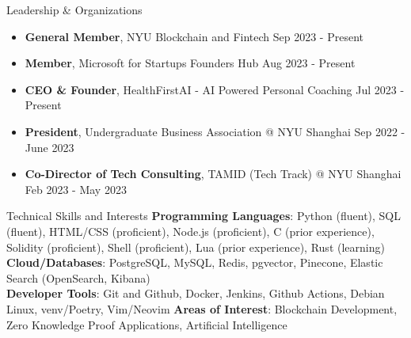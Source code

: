 \documentclass{resume} %
\begin{document}
\begin{rSection}{Leadership \& Organizations}
	\begin{itemize}
		\item \textbf{General Member}{, NYU Blockchain and Fintech} \hfill Sep 2023 - Present
		\item \textbf{Member}{, Microsoft for Startups Founders Hub} \hfill Aug 2023 - Present
		\item \textbf{CEO \& Founder}{, HealthFirstAI - AI Powered Personal Coaching} \hfill Jul 2023 - Present
		\item \textbf{President}{, Undergraduate Business Association @ NYU Shanghai} \hfill Sep 2022 - June 2023
		\item \textbf{Co-Director of Tech Consulting}{, TAMID (Tech Track) @ NYU Shanghai} \hfill Feb 2023 - May 2023
	\end{itemize}
\end{rSection}


\begin{rSection}{Technical Skills and Interests}
	\textbf{Programming Languages}{: Python (fluent), SQL (fluent), HTML/CSS (proficient), Node.js (proficient), C (prior experience), Solidity (proficient), Shell  (proficient), Lua (prior experience), Rust (learning)} \\
	\textbf{Cloud/Databases}{: PostgreSQL, MySQL, Redis, pgvector, Pinecone, Elastic Search (OpenSearch, Kibana)} \\
	\textbf{Developer Tools}{: Git and Github, Docker, Jenkins, Github Actions, Debian Linux, venv/Poetry, Vim/Neovim}
	\textbf{Areas of Interest}{: Blockchain Development, Zero Knowledge Proof Applications, Artificial Intelligence}
\end{rSection}
\end{document}
